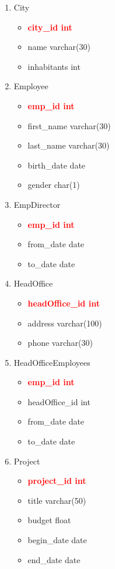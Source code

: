 \documentclass[]{article}
\begin{document}
\begin{enumerate}
\begin{enumerate}
\begin{enumerate}
\item City
\begin{itemize}
\item \textcolor{red}{\textbf{city\_id int}}
\item name varchar(30)
\item inhabitants int
\end{itemize}

\item Employee
\begin{itemize}
\item \textcolor{red}{\textbf{emp\_id int}}
\item first\_name varchar(30)
\item last\_name varchar(30)
\item birth\_date date
\item gender char(1)
\end{itemize}

\item EmpDirector
\begin{itemize}
\item \textcolor{red}{\textbf{emp\_id int}}
\item from\_date date
\item to\_date date
\end{itemize}

\item HeadOffice
\begin{itemize}
\item \textcolor{red}{\textbf{headOffice\_id int}}
\item address varchar(100)
\item phone	varchar(30)
\end{itemize}

\item HeadOfficeEmployees
\begin{itemize}
\item \textcolor{red}{\textbf{emp\_id int}}
\item headOffice\_id int
\item from\_date date
\item to\_date date
\end{itemize}

\item Project
\begin{itemize}
\item \textcolor{red}{\textbf{project\_id int}}
\item title varchar(50)
\item budget float
\item begin\_date date
\item end\_date date
\end{itemize}


\end{enumerate}
\end{enumerate}
\end{enumerate}
\end{document}
